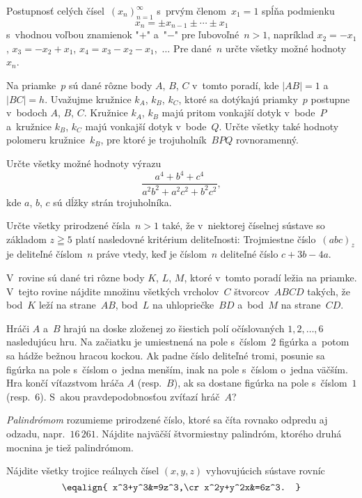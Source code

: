 ﻿{%
Postupnosť celých čísel~$(x_n)_{n=1}^\infty$ s~prvým členom~$x_1=1$ spĺňa podmienku
$$
x_n=\pm x_{n-1}\pm\cdots\pm x_1
$$
s~vhodnou voľbou znamienok "$+$" a~"$-$" pre ľubovoľné~$n>1$, napríklad $x_2=-x_1$, $x_3=-x_2+x_1$, $x_4=x_3-x_2-x_1$,~$\dots$ Pre dané~$n$ určte všetky možné hodnoty~$x_n$.}

{%
Na priamke~$p$ sú dané rôzne body $A$, $B$, $C$ v~tomto poradí, kde $|AB|=1$ a~$|BC|=h$. Uvažujme kružnice $k_A$, $k_B$, $k_C$, ktoré sa dotýkajú priamky~$p$ postupne v~bodoch $A$, $B$, $C$. Kružnice $k_A$, $k_B$ majú pritom vonkajší dotyk v~bode~$P$ a~kružnice $k_B$, $k_C$ majú vonkajší dotyk v~bode~$Q$. Určte všetky také hodnoty polomeru kružnice~$k_B$, pre ktoré je trojuholník~$BPQ$ rovnoramenný.}

{%
Určte všetky možné hodnoty výrazu
$$
\frac{a^4+b^4+c^4}{a^2b^2+a^2c^2+b^2c^2},
$$
kde $a$, $b$, $c$ sú dĺžky strán trojuholníka.}

{%
Určte všetky prirodzené čísla~$n>1$ také, že v~niektorej číselnej sústave so základom $z\geqq5$ platí nasledovné kritérium deliteľnosti:
Trojmiestne číslo~$(abc)_z$ je deliteľné číslom~$n$ práve vtedy, keď je číslom~$n$ deliteľné číslo $c+3b-4a$.}

{%
V~rovine sú dané tri rôzne body $K$, $L$, $M$, ktoré v~tomto poradí ležia na priamke. V~tejto rovine nájdite množinu všetkých vrcholov~$C$ štvorcov~$ABCD$ takých, že bod~$K$ leží na strane~$AB$, bod~$L$ na uhlopriečke~$BD$ a~bod~$M$ na strane~$CD$.}

{%
Hráči $A$ a~$B$ hrajú na doske zloženej zo šiestich polí očíslovaných $1,2,\dots,6$ nasledujúcu hru. Na začiatku je umiestnená na pole s~číslom~$2$ figúrka a~potom sa hádže bežnou hracou kockou. Ak padne číslo deliteľné tromi, posunie sa figúrka na pole s~číslom o~jedna menším, inak na pole s~číslom o~jedna väčším. Hra končí víťazstvom hráča $A$ (resp.~$B$), ak sa dostane figúrka na pole s~číslom~$1$ (resp.~$6$). S~akou pravdepodobnosťou zvíťazí hráč~$A$?}

{%
{\it Palindrómom\/} rozumieme prirodzené číslo, ktoré sa číta rovnako odpredu aj odzadu, napr.~$16\,261$. Nájdite najväčší štvormiestny palindróm, ktorého druhá mocnina je tiež palindrómom.}

{%
Nájdite všetky trojice reálnych čísel $(x,y,z)$ vyhovujúcich sústave rovníc
$$
\eqalign{
x^3+y^3&=9z^3,\cr
x^2y+y^2x&=6z^3.
}
$$
}

